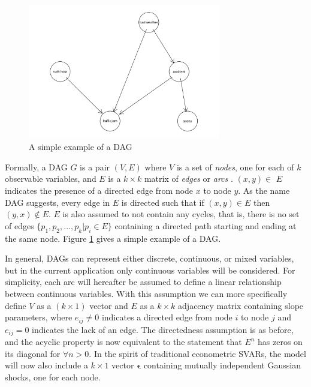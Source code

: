 \documentclass{article}
\begin{document}
\begin{figure}
  \centering
  \includegraphics[width=0.75\textwidth]{images/trafficjam.png}
  \caption{A simple example of a DAG \parencite{traffic_jam}}
  \label{dag1}
\end{figure}

Formally, a DAG $G$ is a pair $(V,E)$ where $V$ is a set of \textit{nodes}, one for each of $k$ observable variables, and $E$ is a $k \times k$ matrix of \textit{edges} or \textit{arcs} \parencite{kalisch2007estimating}. $(x,y) \in$ $E$ indicates the presence of a directed edge from node $x$ to node $y$. As the name DAG suggests, every edge in $E$ is directed such that if $(x,y) \in E$ then $(y,x) \not \in E$. $E$ is also assumed to not contain any cycles, that is, there is no set of edges $\{p_1, p_2, ..., p_k | p_i \in E\}$ containing a directed path starting and ending at the same node. Figure \ref{dag1} gives a simple example of a DAG.

In general, DAGs can represent either discrete, continuous, or mixed variables, but in the current application only continuous variables will be considered. For simplicity, each arc will hereafter be assumed to define a linear relationship between continuous variables. With this assumption we can more specifically define $V$ as a $(k \times 1)$ vector and $E$ as a $k \times k$ adjacency matrix containing slope parameters, where $e_{ij} \not = 0$ indicates a directed edge from node $i$ to node $j$ and $e_{ij} = 0$ indicates the lack of an edge. The directedness assumption is as before, and the acyclic property is now equivalent to the statement that $E^n$ has zeros on its diagonal for $\forall n > 0$. In the spirit of traditional econometric SVARs, the model will now also include a $k \times 1$ vector $\mathbf{\epsilon}$ containing mutually independent Gaussian shocks, one for each node.
\end{document}
